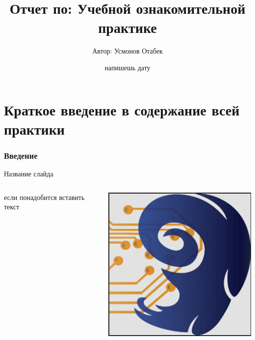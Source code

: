 \documentclass{beamer}
\title{Отчет по: Учебной ознакомительной практике}
\author{Автор: Усмонов Отабек}
\institute{группа:5-205.1}
\date{напишешь дату}
\begin{document}

\begin{frame}%
\titlepage
\end{frame}
\section{Краткое введение в содержание всей практики}

\begin{frame}%
\frametitle{Введение}


    
\end{frame}

\begin{frame}{Название слайда}
    \begin{columns}[T]
        \begin{column}{0.5\textwidth}
            если понадобится вставить текст
        \end{column}
        \begin{column}{0.5\textwidth} 
            \includegraphics[width=\textwidth]{images/Fdp.png}
        \end{column}
    \end{columns}
\end{frame}
\end{document}

